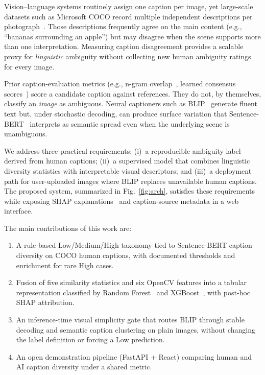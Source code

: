 \documentclass[conference]{IEEEtran}
\begin{document}
Vision--language systems routinely assign one caption per image, yet large-scale datasets such as Microsoft COCO record multiple independent descriptions per photograph~\cite{lin2014coco}. Those descriptions frequently agree on the main content (e.g., ``bananas surrounding an apple'') but may disagree when the scene supports more than one interpretation. Measuring caption disagreement provides a scalable proxy for \emph{linguistic} ambiguity without collecting new human ambiguity ratings for every image.

Prior caption-evaluation metrics (e.g., n-gram overlap~\cite{papineni2002bleu}, learned consensus scores~\cite{vedantam2015cider}) score a candidate caption against references. They do not, by themselves, classify an \emph{image} as ambiguous. Neural captioners such as BLIP~\cite{li2022blip} generate fluent text but, under stochastic decoding, can produce surface variation that Sentence-BERT~\cite{reimers2019sentence} interprets as semantic spread even when the underlying scene is unambiguous.

We address three practical requirements: (i)~a reproducible ambiguity label derived from human captions; (ii)~a supervised model that combines linguistic diversity statistics with interpretable visual descriptors; and (iii)~a deployment path for user-uploaded images where BLIP replaces unavailable human captions. The proposed system, summarized in Fig.~\ref{fig:arch}, satisfies these requirements while exposing SHAP explanations~\cite{lundberg2017shap} and caption-source metadata in a web interface.

The main contributions of this work are:
\begin{enumerate}
\item A rule-based Low/Medium/High taxonomy tied to Sentence-BERT caption diversity on COCO human captions, with documented thresholds and enrichment for rare High cases.
\item Fusion of five similarity statistics and six OpenCV features into a tabular representation classified by Random Forest~\cite{breiman2001} and XGBoost~\cite{chen2016xgboost}, with post-hoc SHAP attribution.
\item An inference-time visual simplicity gate that routes BLIP through stable decoding and semantic caption clustering on plain images, without changing the label definition or forcing a Low prediction.
\item An open demonstration pipeline (FastAPI + React) comparing human and AI caption diversity under a shared metric.
\end{enumerate}
\end{document}
